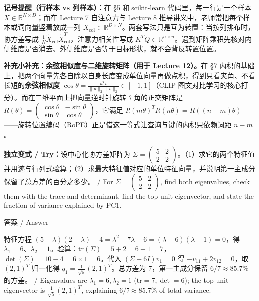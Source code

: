 \textbf{记号提醒（行样本 vs 列样本）：}在 §5 和 scikit-learn 代码里，每一行是一个样本 \(X \in \mathbb{R}^{N \times D}\)；而在 Lecture 7 自注意力与 Lecture 8 推导讲义中，老师常把每个样本或词向量竖着放成一列 \(X_{\text{col}} \in \mathbb{R}^{D \times N}\)。两套写法只是互为转置：当按列排布时，协方差写成 \(\frac{1}{N}\tilde{X}_{\text{col}}\tilde{X}_{\text{col}}^T\)，注意力相关性写成 \(K^T Q \in \mathbb{R}^{n \times n}\)。遇到矩阵乘积先核对内侧维度是否消去、外侧维度是否等于目标形状，就不会背反转置位置。


\textbf{补充小补充：余弦相似度与二维旋转矩阵（用于 Lecture 12）。}在 §7 内积的基础上，把两个向量先各自除以自身长度变成单位向量再做点积，得到只看夹角、不看长短的\textbf{余弦相似度} \(\cos\theta = \frac{u^T v}{\|u\|_2 \|v\|_2} \in [-1, 1]\)（CLIP 图文对比学习的核心打分）。而在二维平面上把向量逆时针旋转 \(\theta\) 角的正交矩阵是 \(R(\theta) = \begin{pmatrix}\cos\theta & -\sin\theta \\ \sin\theta & \cos\theta\end{pmatrix}\)，它满足 \(R(m\theta)^T R(n\theta) = R((n-m)\theta)\)——旋转位置编码（RoPE）正是借这一等式让查询与键的内积只依赖词距 \(n - m\)。


\textbf{独立变式 / Try：}设中心化协方差矩阵为 \(\Sigma = \begin{pmatrix} 5 & 2 \\ 2 & 2 \end{pmatrix}\)。（1）求它的两个特征值并用迹与行列式验算；（2）求最大特征值对应的单位特征向量，并说明第一主成分保留了总方差的百分之多少。 / For \(\Sigma = \begin{pmatrix} 5 & 2 \\ 2 & 2 \end{pmatrix}\), find both eigenvalues, check them with the trace and determinant, find the top unit eigenvector, and state the fraction of variance explained by PC1.



\begin{StudySolution}{答案 / Answer}


特征方程 \((5-\lambda)(2-\lambda) - 4 = \lambda^2 - 7\lambda + 6 = (\lambda - 6)(\lambda - 1) = 0\)，得 \(\lambda_1 = 6\)、\(\lambda_2 = 1\)。验算：\(\mathrm{tr}(\Sigma) = 5 + 2 = 6 + 1 = 7\)，\(\det(\Sigma) = 10 - 4 = 6\times 1 = 6\)。代入 \((\Sigma - 6I)v_1 = 0\) 得 \(-v_{11} + 2v_{12} = 0\)，取 \((2, 1)^T\) 归一化得 \(q_1 = \frac{1}{\sqrt{5}}(2, 1)^T\)。总方差为 \(7\)，第一主成分保留 \(6 / 7 \approx 85.7\%\) 的方差。 / Eigenvalues are \(\lambda_1 = 6, \lambda_2 = 1\) (\(\mathrm{tr}=7, \det=6\)); the top unit eigenvector is \(\frac{1}{\sqrt{5}}(2, 1)^T\), explaining \(6/7 \approx 85.7\%\) of total variance.


\end{StudySolution}


